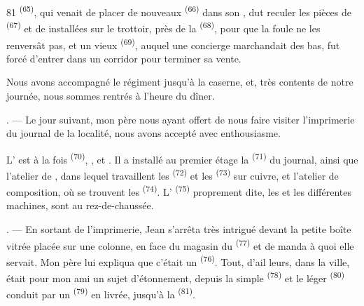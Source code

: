 \begin{VUpage}[83]{81}
\VUcontinue
{} \textsuperscript{(65)}, qui venait de placer de nouveaux\nl
{} \textsuperscript{(66)} dans son , dut reculer les\nl
pièces de  \textsuperscript{(67)} et de  installées sur le\nl
trottoir, près de la  \textsuperscript{(68)}, pour que la\nl
foule ne les renversât pas, et un vieux  \textsuperscript{(69)},\nl
auquel une concierge marchandait des bas, fut forcé\nl
d'entrer dans un corridor pour terminer sa vente.

\VUblancAlinea
Nous avons accompagné le régiment jusqu'à la\nl
caserne, et, très contents de notre journée, nous\nl
sommes rentrés à l'heure du dîner.

\VUsaut{3.0mm}
\VUfilet{16mm}
\VUsaut{3.0mm}

. --- Le jour suivant, mon père nous ayant offert\nl
de nous faire visiter l'imprimerie du journal de la\nl
localité, nous avons accepté avec enthousiasme.

\VUblancAlinea
L' est à la fois  \textsuperscript{(70)}, ,\nl
{} et . Il a installé au premier étage\nl
la  \textsuperscript{(71)} du journal, ainsi que l'atelier de\nl
{}, dans lequel travaillent les \cc
{} \textsuperscript{(72)} et les  \textsuperscript{(73)} sur cuivre, et l'atelier\nl
de composition, où se trouvent les  \textsuperscript{(74)}.\nl
L' \textsuperscript{(75)} proprement dite, les  et\nl
les différentes machines, sont au rez-de-chaussée.

. --- En sortant de l'imprimerie, Jean s'arrêta très\nl
intrigué devant la petite boîte vitrée placée sur une\nl
colonne, en face du magasin du  \textsuperscript{(77)} et de\cc
manda à quoi elle servait. Mon père lui expliqua que\nl
c'était un  \textsuperscript{(76)}. Tout, d'ail\cc
leurs, dans la ville, était pour mon ami un sujet\nl
d'étonnement, depuis la simple  \textsuperscript{(78)}\nl
et le léger  \textsuperscript{(80)} conduit par un\nl
{} \textsuperscript{(79)} en livrée, jusqu'à la \nl
{} \textsuperscript{(81)}.


\end{VUpage}
